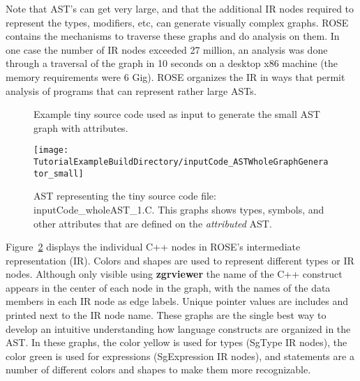    Note that AST's can get very large, and that the additional IR nodes required to
represent the types, modifiers, etc, can generate visually complex graphs. ROSE
contains the mechanisms to traverse these graphs and do analysis on them.  In
one case the number of IR nodes exceeded 27 million, an analysis was done through
a traversal of the graph in 10 seconds on a desktop x86 machine (the memory requirements
were 6 Gig).  ROSE organizes the IR in ways that permit analysis of programs that can 
represent rather large ASTs.



\begin{figure}[!h]
{\indent
{\mySmallFontSize

\begin{latexonly}
   
\end{latexonly}

\begin{htmlonly}
   
\end{htmlonly}

}
}
\caption{Example tiny source code used as input to generate the small AST graph with attributes.}
\label{Tutorial:exampleInputCode_ASTGraphGenerator_small}
\end{figure}

\begin{figure}
\texttt{[image: \\TutorialExampleBuildDirectory/inputCode\_ASTWholeGraphGenerator\_small]}
\caption{AST representing the tiny source code file: inputCode\_wholeAST\_1.C. This graphs
    shows types, symbols, and other attributes that are defined on the {\em attributed} AST.}
\label{tutorial:exampleOutputCodeWholeGraph_small}
\end{figure}

   Figure~\ref{tutorial:exampleOutputCodeWholeGraph_small} displays the individual
C++ nodes in ROSE's intermediate representation (IR).  Colors and shapes are used to 
represent different types or IR nodes. Although only visible using {\bf zgrviewer} 
the name of the C++ construct appears in the center of each node in the graph, with 
the names of the data members in each IR node as edge labels. Unique pointer values
are includes and printed next to the IR node name.  These graphs are the single best
way to develop an intuitive understanding how language constructs are organized
in the AST.  In these graphs, the color yellow is used for types (SgType IR nodes),
the color green is used for expressions (SgExpression IR nodes), and statements
are a number of different colors and shapes to make them more recognizable.


